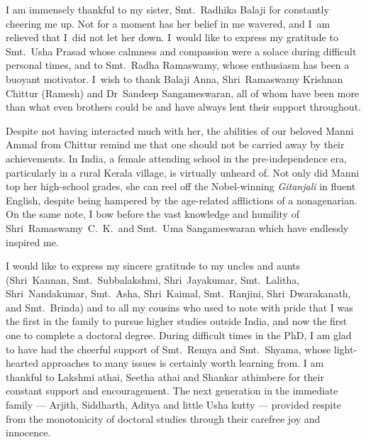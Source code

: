 I am immensely thankful to my sister, Smt.~Radhika Balaji for constantly
cheering me up. Not for a moment has her belief in me wavered, and I~am relieved
that I~did not let her down. I~would like to express my gratitude to Smt.~Usha
Prasad whose calmness and compassion were a solace during difficult personal
times, and to Smt.~Radha Ramaswamy, whose enthusiasm has been a  buoyant
motivator. I~wish to thank Balaji Anna, Shri~Ramaswamy Krishnan Chittur (Ramesh)
and Dr~Sandeep Sangameswaran, all of whom have been more than what even brothers
could be and have always lent their support throughout.


\addlines[1]

Despite not having interacted much with her, the abilities of our beloved Manni
Ammal from Chittur remind me that one should not be carried away by their
achievements. In India, a female attending school in the pre-independence era,
particularly in a rural Kerala village, is virtually unheard of. Not only did
Manni top her high-school grades, she can reel off the Nobel-winning
\emph{Gitanjali} in fluent English, despite being hampered by the age-related
afflictions of a nonagenarian. On the same note, I bow before the vast knowledge
and humility of Shri~Ramaswamy~C.~K.\ and Smt.~Uma Sangameswaran which have
endlessly inspired me.


I would like to express my sincere gratitude to my uncles and aunts
(Shri~Kannan, Smt.~Subbalakshmi, Shri~Jayakumar, Smt.~Lalitha,  Shri~Nandakumar,
Smt.~Asha, Shri~Kaimal, Smt.~Ranjini, Shri~Dwarakanath, and Smt.~Brinda) and to
all my cousins who used to note with pride that I was the first in the family to
pursue higher studies outside India, and now the first one to complete a
doctoral degree. During  difficult times in the PhD, I am glad to have had the
cheerful support of Smt.~Remya and Smt.~Shyama, whose light-hearted approaches
to many issues is certainly worth learning from. I am thankful to Lakshmi athai,
Seetha athai and Shankar athimbere for their constant support and encouragement.
The next generation in the immediate family --- Arjith, Siddharth, Aditya and
little Usha kutty --- provided respite from the monotonicity of doctoral studies
through their carefree joy and innocence.


